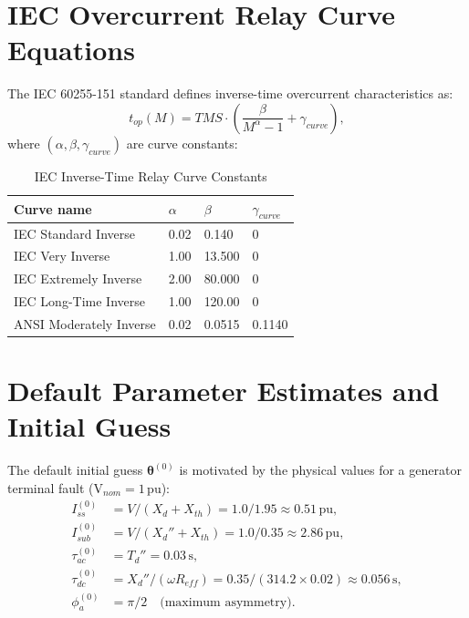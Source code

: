 \documentclass[12pt, a4paper]{article}
\theoremstyle{definition}
\theoremstyle{plain}
\newcommand{\vect}[1]{\bm{#1}}
\newcommand{\pu}{\,\text{pu}}
\begin{document}
\section{IEC Overcurrent Relay Curve Equations}
\label{app:iec}

The IEC 60255-151 standard defines inverse-time overcurrent characteristics as:
\begin{equation}
  t_{op}(M) = TMS \cdot \left(\frac{\beta}{M^\alpha - 1} + \gamma_{curve}\right),
  \label{eq:iec_general}
\end{equation}
where $(\alpha, \beta, \gamma_{curve})$ are curve constants:

\begin{table}[h]
\centering
\caption{IEC Inverse-Time Relay Curve Constants}
\label{tab:iec_constants}
\begin{tabular}{llll}
\toprule
\textbf{Curve name} & $\alpha$ & $\beta$ & $\gamma_{curve}$ \\
\midrule
IEC Standard Inverse    & 0.02  & 0.140  & 0 \\
IEC Very Inverse        & 1.00  & 13.500 & 0 \\
IEC Extremely Inverse   & 2.00  & 80.000 & 0 \\
IEC Long-Time Inverse   & 1.00  & 120.00 & 0 \\
ANSI Moderately Inverse & 0.02  & 0.0515 & 0.1140 \\
\bottomrule
\end{tabular}
\end{table}

\section{Default Parameter Estimates and Initial Guess}
\label{app:defaults}

The default initial guess $\vect{\theta}^{(0)}$ is motivated by the
physical values for a generator terminal fault (V$_{nom} = 1\pu$):
\begin{align}
  I_{ss}^{(0)}   &= V/(X_d + X_{th}) = 1.0/1.95 \approx 0.51\pu, \\
  I_{sub}^{(0)}  &= V/(X_d'' + X_{th}) = 1.0/0.35 \approx 2.86\pu, \\
  \tau_{ac}^{(0)}&= T_d'' = 0.03\,\text{s}, \\
  \tau_{dc}^{(0)}&= X_d''/(\omega R_{eff}) = 0.35/(314.2 \times 0.02) \approx 0.056\,\text{s}, \\
  \phi_a^{(0)}   &= \pi/2\quad\text{(maximum asymmetry)}.
\end{align}
\end{document}
